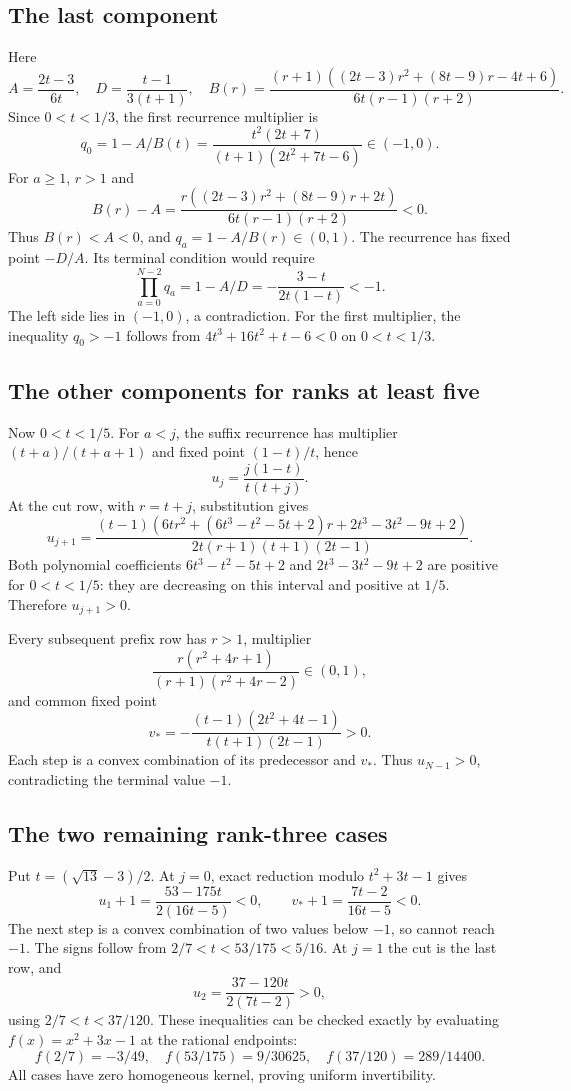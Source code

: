 \documentclass[11pt,a4paper]{article}
\numberwithin{equation}{section}
\theoremstyle{definition}\newtheorem{definition}[theorem]{Definition}
\theoremstyle{remark}\newtheorem{remark}[theorem]{Remark}
\begin{document}
\subsection{The last component}

Here
\[
 A=\frac{2t-3}{6t},\quad
 D=\frac{t-1}{3(t+1)},\quad
 B(r)=\frac{(r+1)((2t-3)r^2+(8t-9)r-4t+6)}
                 {6t(r-1)(r+2)}.
\]
Since \(0<t<1/3\), the first recurrence multiplier is
\[
 q_0=1-A/B(t)=
 \frac{t^2(2t+7)}{(t+1)(2t^2+7t-6)}\in(-1,0).
\]
For \(a\ge1\), \(r>1\) and
\[
 B(r)-A=
 \frac{r((2t-3)r^2+(8t-9)r+2t)}{6t(r-1)(r+2)}<0.
\]
Thus \(B(r)<A<0\), and \(q_a=1-A/B(r)\in(0,1)\).
The recurrence has fixed point \(-D/A\). Its terminal condition
would require
\[
       \prod_{a=0}^{N-2}q_a=1-A/D
                          =-\frac{3-t}{2t(1-t)}<-1.
\]
The left side lies in \((-1,0)\), a contradiction.
For the first multiplier, the inequality \(q_0>-1\) follows from
\(4t^3+16t^2+t-6<0\) on \(0<t<1/3\).

\subsection{The other components for ranks at least five}

Now \(0<t<1/5\). For \(a<j\), the suffix recurrence has multiplier
\((t+a)/(t+a+1)\) and fixed point \((1-t)/t\), hence
\[
                         u_j=\frac{j(1-t)}{t(t+j)}.
\]
At the cut row, with \(r=t+j\), substitution gives
\[
 u_{j+1}=
 \frac{(t-1)\left(6tr^2+(6t^3-t^2-5t+2)r
                         +2t^3-3t^2-9t+2\right)}
      {2t(r+1)(t+1)(2t-1)}.
\]
Both polynomial coefficients
\(6t^3-t^2-5t+2\) and \(2t^3-3t^2-9t+2\) are positive for
\(0<t<1/5\): they are decreasing on this interval and positive
at \(1/5\). Therefore \(u_{j+1}>0\).

Every subsequent prefix row has \(r>1\), multiplier
\[
    \frac{r(r^2+4r+1)}{(r+1)(r^2+4r-2)}\in(0,1),
\]
and common fixed point
\[
                 v_*=-\frac{(t-1)(2t^2+4t-1)}
                                  {t(t+1)(2t-1)}>0.
\]
Each step is a convex combination of its predecessor and \(v_*\).
Thus \(u_{N-1}>0\), contradicting the terminal value \(-1\).

\subsection{The two remaining rank-three cases}

Put \(t=(\sqrt{13}-3)/2\). At \(j=0\), exact reduction modulo
\(t^2+3t-1\) gives
\[
 u_1+1=\frac{53-175t}{2(16t-5)}<0,\qquad
 v_*+1=\frac{7t-2}{16t-5}<0.
\]
The next step is a convex combination of two values below \(-1\),
so cannot reach \(-1\). The signs follow from
\(2/7<t<53/175<5/16\).
At \(j=1\) the cut is the last row, and
\[
                 u_2=\frac{37-120t}{2(7t-2)}>0,
\]
using \(2/7<t<37/120\).
These inequalities can be checked exactly by evaluating
\(f(x)=x^2+3x-1\) at the rational endpoints:
\[
 f(2/7)=-3/49,\quad
 f(53/175)=9/30625,\quad
 f(37/120)=289/14400.
\]
All cases have zero homogeneous kernel, proving uniform
invertibility.
\end{document}
